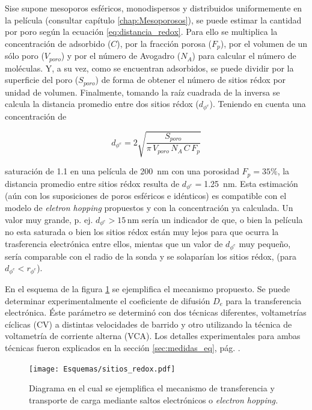 	 	 Si\space se supone mesoporos esféricos, monodispersos y distribuidos uniformemente en la película (consultar capítulo \ref{chap:Mesoporosos}), se puede estimar la cantidad \ru\space por poro según la ecuación \ref{eq:distancia_redox}. Para ello se multiplica la concentración de \ru\space adsorbido ($C$), por la fracción porosa ($F_p$), por el volumen de un sólo poro ($V_{poro}$) y por el número de Avogadro ($N_{A}$) para calcular el número de moléculas. Y, a su vez, como se encuentran adsorbidos, se puede dividir por la superficie del poro ($S_{poro}$) de forma de obtener el número de sitios rédox por unidad de volumen. Finalmente, tomando la raíz cuadrada de la inversa se calcula la distancia promedio entre dos sitios rédox ($d_{\phi^{e}}$). Teniendo en cuenta una concentración de \linebreak
	 		
	 		\begin{equation}
					d_{\phi^{e}}=2\sqrt{\frac{S_{poro}}{\pi\, V_{poro}\, N_A\, C\, F_p}}
					\label{eq:distancia_redox}
			\end{equation}

	     \noindent saturación de \SI{1,1}{\Molar} en una película de \SI{200}{nm} con una porosidad $F_p=35\%$, la distancia promedio entre sitios rédox resulta de $d_{\phi^{e}}=$\SI{1.25}{nm}. Esta estimación (aún con los suposiciones de poros esféricos e idénticos) es compatible con el modelo de \textit{eletron hopping} propuestos y con la concentración ya calculada. Un valor muy grande, p. ej. $d_{\phi^{e}}>15\, \text{nm}$ sería un indicador de que, o bien la película no esta saturada o bien los sitios rédox están muy lejos para que ocurra la trasferencia electrónica entre ellos, mientas que un valor de $d_{\phi^{e}}$ muy pequeño, sería comparable con el radio de la sonda y se solaparían los sitios rédox, (para $d_{\phi^{e}} < r_{\phi^{e}}$). 
	
	     En el esquema de la figura \ref{fig:sitios_redox} se ejemplifica el mecanismo propuesto. Se puede determinar experimentalmente el coeficiente de difusión $D_e$ para la transferencia electrónica. Éste parámetro se determinó con dos técnicas diferentes, voltametrías cíclicas (CV) a distintas velocidades de barrido y otro utilizando la técnica de voltametría de corriente alterna (VCA). Los detalles experimentales para ambas técnicas fueron explicados en la sección \ref{sec:medidas_eq}, pág. \pageref{sec:medidas_eq}.
			\begin{figure}[ht!]
					\centering
			 	    \texttt{[image: Esquemas/sitios\_redox.pdf]}
			        \caption[Mecanismo de transferencia de electrones]{Diagrama en el cual se ejemplifica el mecanismo de transferencia y transporte de carga mediante saltos electrónicos o \textit{electron hopping.}}
			        \label{fig:sitios_redox}
			      	\end{figure} 

